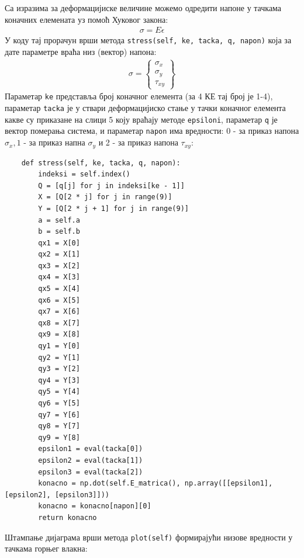 \documentclass[11pt, a4paper]{article}
\begin{document}
Са изразима за деформацијиске величине можемо одредити напоне у тачкама коначних елемената уз помоћ Хуковог закона:
\begin{eqnarray}
\sigma = E \epsilon
\end{eqnarray}
У коду тај прорачун врши метода \texttt{stress(self, ke, tacka, q, napon)} која за дате параметре враћа низ (вектор) напона:
\begin{eqnarray}
\sigma = 
\begin{Bmatrix}
\sigma_x \\
\sigma_y \\
\tau_{xy}
\end{Bmatrix}
\end{eqnarray}
Параметар \texttt{ke} представља број коначног елемента (за 4 КЕ тај број је 1-4), параметар \texttt{tacka} је у ствари деформацијиско стање у тачки коначног елемента какве су приказане на слици 5 коју враћају методе \texttt{epsiloni}, параметар \texttt{q} је вектор померања система, и параметар \texttt{napon} има вредности: 0 - за приказ напона $\sigma_x, 1$ - за приказ напна $\sigma_y$ и 2 - за приказ напона $\tau_{xy}$:
\begin{lstlisting}
    def stress(self, ke, tacka, q, napon):
        indeksi = self.index()
        Q = [q[j] for j in indeksi[ke - 1]]
        X = [Q[2 * j] for j in range(9)]
        Y = [Q[2 * j + 1] for j in range(9)]
        a = self.a
        b = self.b
        qx1 = X[0]
        qx2 = X[1]
        qx3 = X[2]
        qx4 = X[3]
        qx5 = X[4]
        qx6 = X[5]
        qx7 = X[6]
        qx8 = X[7]
        qx9 = X[8]
        qy1 = Y[0]
        qy2 = Y[1]
        qy3 = Y[2]
        qy4 = Y[3]
        qy5 = Y[4]
        qy6 = Y[5]
        qy7 = Y[6]
        qy8 = Y[7]
        qy9 = Y[8]
        epsilon1 = eval(tacka[0])
        epsilon2 = eval(tacka[1])
        epsilon3 = eval(tacka[2])
        konacno = np.dot(self.E_matrica(), np.array([[epsilon1], [epsilon2], [epsilon3]]))
        konacno = konacno[napon][0]
        return konacno
\end{lstlisting}
Штампање дијаграма врши метода \texttt{plot(self)} формирајући низове вредности у тачкама горњег влакна:
\end{document}
